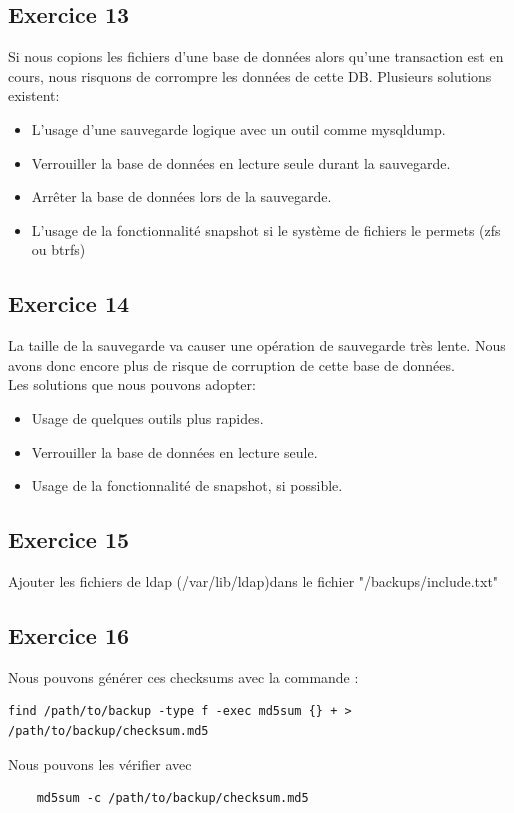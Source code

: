 \documentclass{report}
\begin{document}
\subsection{Exercice 13}
Si nous copions les fichiers d'une base de données alors qu'une transaction est en cours, nous
risquons de corrompre les données de cette DB.
Plusieurs solutions existent:
\begin{itemize}
  \item L'usage d'une sauvegarde logique avec un outil comme mysqldump.
  \item Verrouiller la base de données en lecture seule durant la sauvegarde.
  \item Arrêter la base de données lors de la sauvegarde.
  \item L'usage de la fonctionnalité snapshot si le système de fichiers le permets (zfs ou btrfs)
\end{itemize}
\subsection{Exercice 14}
La taille de la sauvegarde va causer une opération de sauvegarde très lente. Nous avons donc encore
plus de risque de corruption de cette base de données.\\
Les solutions que nous pouvons adopter:
\begin{itemize}
\item Usage de quelques outils plus rapides.
\item Verrouiller la base de données en lecture seule.
\item Usage de la fonctionnalité de snapshot, si possible.
\end{itemize}
\subsection{Exercice 15}
Ajouter les fichiers de ldap (/var/lib/ldap)dans le fichier "/backups/include.txt"
\subsection{Exercice 16}
Nous pouvons générer ces checksums avec la commande :
\begin{tcolorbox}
  \begin{verbatim}
find /path/to/backup -type f -exec md5sum {} + > /path/to/backup/checksum.md5
\end{verbatim}
\end{tcolorbox}
Nous pouvons les vérifier avec
\begin{tcolorbox}
  \begin{verbatim}
    md5sum -c /path/to/backup/checksum.md5
  \end{verbatim}
\end{tcolorbox}
\end{document}
